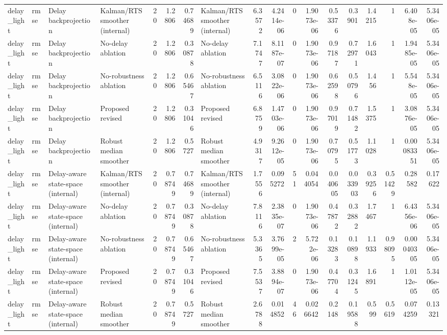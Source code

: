 \begin{table}[!htbp]
{\begin{tabular}{llllrrrlrrrrrrrrrr}
delay_light & rmse & Delay backprojection & Kalman/RTS smoother (internal) & 20 & 1.2806 & 0.74689 & Kalman/RTS smoother (internal) & 6.3572 & 4.2414e-06 & 0 & 1.9073e-06 & 0.53376 & 0.3901 & 1.4215 & 1 & 6.408e-05 & 5.3406e-05 \\
delay_light & rmse & Delay backprojection & No-delay ablation & 20 & 1.2806 & 0.30878 & No-delay ablation & 7.1747 & 8.1187e-07 & 0 & 1.9073e-06 & 0.97187 & 0.72971 & 1.6043 & 1 & 1.9485e-05 & 5.3406e-05 \\
delay_light & rmse & Delay backprojection & No-robustness ablation & 20 & 1.2806 & 0.65467 & No-robustness ablation & 6.5116 & 3.0822e-06 & 0 & 1.9073e-06 & 0.62598 & 0.50796 & 1.456 & 1 & 5.548e-05 & 5.3406e-05 \\
delay_light & rmse & Delay backprojection & Proposed revised & 20 & 1.2806 & 0.31046 & Proposed revised & 6.8759 & 1.4703e-06 & 0 & 1.9073e-06 & 0.97019 & 0.71482 & 1.5375 & 1 & 3.0876e-05 & 5.3406e-05 \\
delay_light & rmse & Delay backprojection & Robust median smoother & 20 & 1.2806 & 0.5727 & Robust median smoother & 4.9317 & 9.2612e-05 & 0 & 1.9073e-06 & 0.70795 & 0.51773 & 1.1028 & 1 & 0.00083351 & 5.3406e-05 \\
delay_light & rmse & Delay-aware state-space (internal) & Kalman/RTS smoother (internal) & 20 & 0.78749 & 0.74689 & Kalman/RTS smoother (internal) & 1.7556 & 0.095272 & 51 & 0.044054 & 0.040605 & 0.033903 & 0.39256 & 0.51429 & 0.28582 & 0.17622 \\
delay_light & rmse & Delay-aware state-space (internal) & No-delay ablation & 20 & 0.78749 & 0.30878 & No-delay ablation & 7.8116 & 2.3835e-07 & 0 & 1.9073e-06 & 0.47872 & 0.32882 & 1.7467 & 1 & 6.4356e-06 & 5.3406e-05 \\
delay_light & rmse & Delay-aware state-space (internal) & No-robustness ablation & 20 & 0.78749 & 0.65467 & No-robustness ablation & 5.3365 & 3.7699e-05 & 2 & 5.722e-06 & 0.13283 & 0.10898 & 1.1933 & 0.98095 & 0.00040305 & 5.3406e-05 \\
delay_light & rmse & Delay-aware state-space (internal) & Proposed revised & 20 & 0.78749 & 0.31046 & Proposed revised & 7.5537 & 3.8894e-07 & 0 & 1.9073e-06 & 0.47704 & 0.31245 & 1.6891 & 1 & 1.0112e-05 & 5.3406e-05 \\
delay_light & rmse & Delay-aware state-space (internal) & Robust median smoother & 20 & 0.78749 & 0.5727 & Robust median smoother & 2.6788 & 0.014852 & 46 & 0.026642 & 0.2148 & 0.19588 & 0.599 & 0.5619 & 0.074259 & 0.13321 \\

\end{tabular}}
\end{table}
